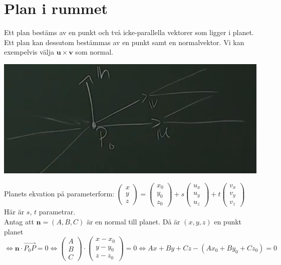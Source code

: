 \chapter{Plan i rummet}
Ett plan bestäms av en punkt och två icke-parallella vektorer som ligger i planet.
Ett plan kan dessutom bestämmas av en punkt samt en normalvektor.
Vi kan exempelvis välja $\bm{u}\times \bm{v}$ som normal.
\begin{center}
    \includegraphics[scale=0.3]{imgs/img01.png}
\end{center}
Planets ekvation på parameterform: $
\begin{pmatrix}
    x\\y\\z
\end{pmatrix}
=
\begin{pmatrix}
    x_{0}\\y_{0}\\z_{0}
\end{pmatrix}
+s
\begin{pmatrix}
    u_{x}\\u_{y}\\u_{z}
\end{pmatrix}
+t
\begin{pmatrix}
    v_{x}\\v_{y}\\v_{z}
\end{pmatrix}$\\
Här är $s$, $t$ parametrar.\\
Antag att $\bm{n}=(A,B,C)$ är en normal till planet.
Då är $(x,y,z)$ en punkt planet $\Leftrightarrow \bm{n}\cdot \overrightarrow{P_{0}P}=0\Leftrightarrow \begin{pmatrix}
    A\\B\\C
\end{pmatrix}\cdot \begin{pmatrix}
    x-x_{0}\\y-y_{0}\\z-z_{0}
\end{pmatrix}=0\Leftrightarrow Ax+By+Cz-(Ax_{0}+By_{0}+Cz_{0})=0$\\
